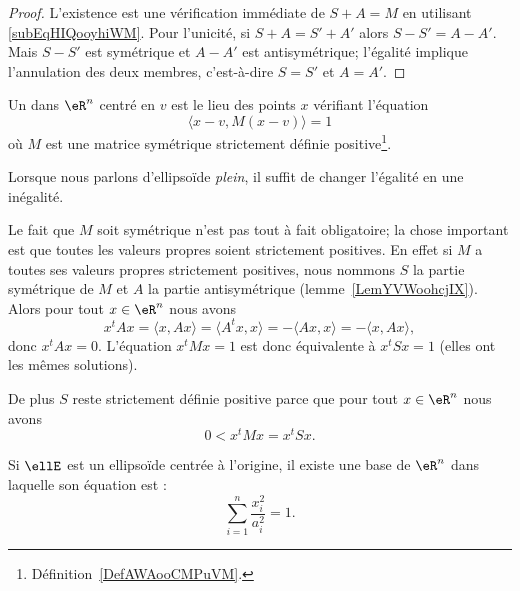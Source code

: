 \begin{proof}
    L'existence est une vérification immédiate de \( S+A=M\) en utilisant \eqref{subEqHIQooyhiWM}. Pour l'unicité, si \( S+A=S'+A'\) alors \( S-S'=A-A'\). Mais \( S-S'\) est symétrique et \( A-A'\) est antisymétrique; l'égalité implique l'annulation des deux membres, c'est-à-dire \( S=S'\) et \( A=A'\).
\end{proof}

\begin{definition}  \label{DefOEPooqfXsE}
    Un  dans \( \eR^n\) centré en \( v\) est le lieu des points \( x\) vérifiant l'équation
    \begin{equation}\label{EqSNWooXfbTH}
        \langle x-v, M(x-v)\rangle =1
    \end{equation}
    où \( M\) est une matrice symétrique strictement définie positive\footnote{Définition~\ref{DefAWAooCMPuVM}.}.

    Lorsque nous parlons d'ellipsoïde \emph{plein}, il suffit de changer l'égalité en une inégalité.
\end{definition}

\begin{remark}
    Le fait que \( M\) soit symétrique n'est pas tout à fait obligatoire; la chose important est que toutes les valeurs propres soient strictement positives. En effet si \( M\) a toutes ses valeurs propres strictement positives, nous nommons \( S\) la partie symétrique de \( M\) et \( A\) la partie antisymétrique (lemme~\ref{LemYVWoohcjIX}). Alors pour tout \( x\in \eR^n\) nous avons
    \begin{equation}
        x^tAx=\langle x, Ax\rangle =\langle A^tx,x \rangle =-\langle Ax, x\rangle =-\langle x,Ax\rangle ,
    \end{equation}
    donc \( x^tAx=0\). L'équation \( x^tMx=1\) est donc équivalente à \( x^tSx=1\) (elles ont les mêmes solutions).

    De plus \( S\) reste strictement définie positive parce que pour tout \( x\in \eR^n\) nous avons
    \begin{equation}
        0<x^tMx=x^tSx.
    \end{equation}
\end{remark}

\begin{proposition}\label{PropWDRooQdJiIr}
    Si \( \ellE\) est un ellipsoïde centrée à l'origine, il existe une base de \( \eR^n\) dans laquelle son équation est :
    \begin{equation}
        \sum_{i=1}^n\frac{ x_i^2 }{ a_i^2 }=1.
    \end{equation}
\end{proposition}

